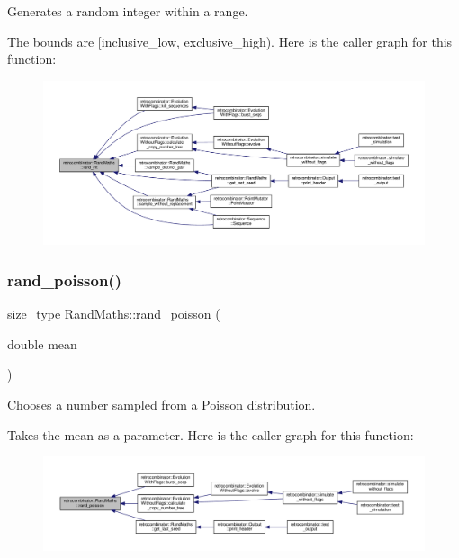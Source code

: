 Generates a random integer within a range. 

The bounds are \mbox{[}inclusive\+\_\+low, exclusive\+\_\+high). Here is the caller graph for this function\+:
\nopagebreak
\begin{figure}[H]
\begin{center}
\leavevmode
\includegraphics[width=350pt]{classretrocombinator_1_1RandMaths_a8072bad64e64ef042e5257e1bee85635_icgraph}
\end{center}
\end{figure}
\mbox{\label{classretrocombinator_1_1RandMaths_adef66efd4d58f6130982ff0ee0e25750}} 
\subsubsection{\texorpdfstring{rand\+\_\+poisson()}{rand\_poisson()}}
{\footnotesize\ttfamily \hyperlink{namespaceretrocombinator_a8e1541b50cee66a791df4c437ccbb385}{size\+\_\+type} Rand\+Maths\+::rand\+\_\+poisson (\begin{DoxyParamCaption}\item[{double}]{mean }\end{DoxyParamCaption})}



Chooses a number sampled from a Poisson distribution. 

Takes the mean as a parameter. Here is the caller graph for this function\+:
\nopagebreak
\begin{figure}[H]
\begin{center}
\leavevmode
\includegraphics[width=350pt]{classretrocombinator_1_1RandMaths_adef66efd4d58f6130982ff0ee0e25750_icgraph}
\end{center}
\end{figure}
\mbox{\label{classretrocombinator_1_1RandMaths_aa6441baa59bff50f588c0c54e3c54140}} 
